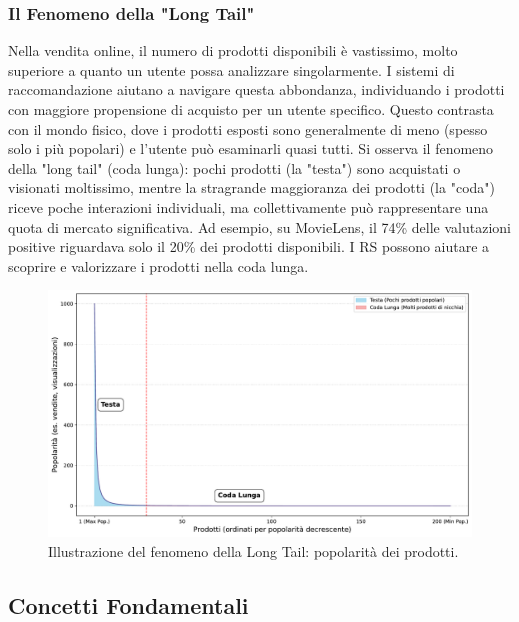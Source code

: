 \documentclass{article}
\begin{document}
\subsubsection{Il Fenomeno della "Long Tail"}
Nella vendita online, il numero di prodotti disponibili è vastissimo, molto superiore a quanto un utente possa analizzare singolarmente. I sistemi di raccomandazione aiutano a navigare questa abbondanza, individuando i prodotti con maggiore propensione di acquisto per un utente specifico. Questo contrasta con il mondo fisico, dove i prodotti esposti sono generalmente di meno (spesso solo i più popolari) e l'utente può esaminarli quasi tutti.
Si osserva il fenomeno della "long tail" (coda lunga): pochi prodotti (la "testa") sono acquistati o visionati moltissimo, mentre la stragrande maggioranza dei prodotti (la "coda") riceve poche interazioni individuali, ma collettivamente può rappresentare una quota di mercato significativa. Ad esempio, su MovieLens, il 74\% delle valutazioni positive riguardava solo il 20\% dei prodotti disponibili. I RS possono aiutare a scoprire e valorizzare i prodotti nella coda lunga.

\begin{figure}[H]
    \centering
    \includegraphics[width=1\textwidth]{images/long_tail_graph.pdf}
    \caption{Illustrazione del fenomeno della Long Tail: popolarità dei prodotti.}
    \label{fig:long_tail}
\end{figure}

\subsection{Concetti Fondamentali}
\end{document}
